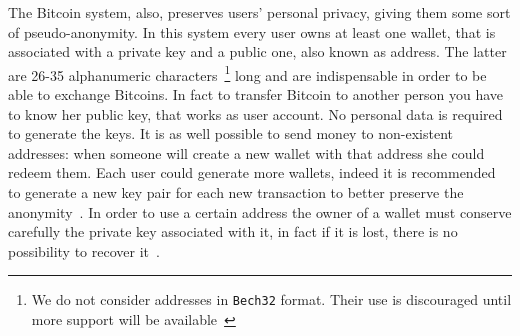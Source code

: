 The Bitcoin system, also, preserves users' personal privacy, giving them some
sort of pseudo-anonymity. In this system every user owns at least one wallet,
that is associated with a private key and a public one, also known as address.
The latter are 26-35 alphanumeric
characters~\cite{bib:bitcoinwiki:address}\footnote{We do not consider addresses
in \texttt{Bech32} format. Their use is
discouraged until more support will be available~\cite{bib:bitcoinwiki:bech32}}
long and are indispensable in order to be able to exchange Bitcoins.
In fact to transfer Bitcoin to another person you have to know her
public key, that works as user account. No personal data is required to generate
the keys. It is as well possible to send money to non-existent addresses: when
someone will create a new wallet with that address she could redeem
them. Each user could generate more wallets, indeed it is recommended
to generate a new key pair for each new transaction to better preserve
the anonymity~\cite{bib:satoshi}.
In order to use a certain address the owner of
a wallet must conserve carefully the private key associated with it, in fact
if it is lost, there is no possibility to recover it~\cite{bib:respCrypto}.


